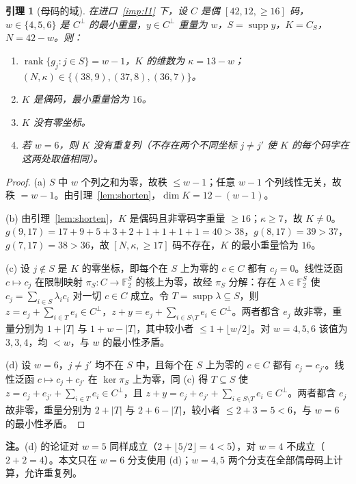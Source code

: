 \documentclass[11pt]{ctexart}
\newtheorem{lemma}{引理}
\theoremstyle{definition}
\newcommand{\F}{\mathbb{F}_2}
\newcommand{\rank}{\operatorname{rank}}
\newcommand{\supp}{\operatorname{supp}}
\begin{document}
\begin{lemma}[母码的域]\label{lem:mother}
在进口~\ref{imp:I1} 下，设 $C$ 是偶 $[42,12,\ge16]$ 码，$w\in\{4,5,6\}$ 是 $C^\perp$ 的最小重量，$y\in C^\perp$ 重量为 $w$，$S=\supp y$，$K=C_S$，$N=42-w$。则：
\begin{enumerate}
\item[(a)] $\rank\{g_j:j\in S\}=w-1$，$K$ 的维数为 $\kappa=13-w$；$(N,\kappa)\in\{(38,9),(37,8),(36,7)\}$。
\item[(b)] $K$ 是偶码，最小重量恰为 $16$。
\item[(c)] $K$ 没有零坐标。
\item[(d)] 若 $w=6$，则 $K$ 没有重复列（不存在两个不同坐标 $j\ne j'$ 使 $K$ 的每个码字在这两处取值相同）。
\end{enumerate}
\end{lemma}
\begin{proof}
(a) $S$ 中 $w$ 个列之和为零，故秩 $\le w-1$；任意 $w-1$ 个列线性无关，故秩 $=w-1$。由引理~\ref{lem:shorten}，$\dim K=12-(w-1)$。

(b) 由引理~\ref{lem:shorten}，$K$ 是偶码且非零码字重量 $\ge16$；$\kappa\ge7$，故 $K\ne0$。$g(9,17)=17+9+5+3+2+1+1+1+1=40>38$，$g(8,17)=39>37$，$g(7,17)=38>36$，故 $[N,\kappa,\ge17]$ 码不存在，$K$ 的最小重量恰为 $16$。

(c) 设 $j\notin S$ 是 $K$ 的零坐标，即每个在 $S$ 上为零的 $c\in C$ 都有 $c_j=0$。线性泛函 $c\mapsto c_j$ 在限制映射 $\pi_S:C\to\F^S$ 的核上为零，故经 $\pi_S$ 分解：存在 $\lambda\in\F^S$ 使 $c_j=\sum_{i\in S}\lambda_ic_i$ 对一切 $c\in C$ 成立。令 $T=\supp\lambda\subseteq S$，则 $z=e_j+\sum_{i\in T}e_i\in C^\perp$，$z+y=e_j+\sum_{i\in S\setminus T}e_i\in C^\perp$。两者都含 $e_j$ 故非零，重量分别为 $1+|T|$ 与 $1+w-|T|$，其中较小者 $\le 1+\lfloor w/2\rfloor$。对 $w=4,5,6$ 该值为 $3,3,4$，均 $<w$，与 $w$ 的最小性矛盾。

(d) 设 $w=6$，$j\ne j'$ 均不在 $S$ 中，且每个在 $S$ 上为零的 $c\in C$ 都有 $c_j=c_{j'}$。线性泛函 $c\mapsto c_j+c_{j'}$ 在 $\ker\pi_S$ 上为零，同 (c) 得 $T\subseteq S$ 使 $z=e_j+e_{j'}+\sum_{i\in T}e_i\in C^\perp$，且 $z+y=e_j+e_{j'}+\sum_{i\in S\setminus T}e_i\in C^\perp$。两者都含 $e_j$ 故非零，重量分别为 $2+|T|$ 与 $2+6-|T|$，较小者 $\le 2+3=5<6$，与 $w=6$ 的最小性矛盾。
\end{proof}

\noindent\textbf{注。}(d) 的论证对 $w=5$ 同样成立（$2+\lfloor5/2\rfloor=4<5$），对 $w=4$ 不成立（$2+2=4$）。本文只在 $w=6$ 分支使用 (d)；$w=4,5$ 两个分支在全部偶母码上计算，允许重复列。
\end{document}
